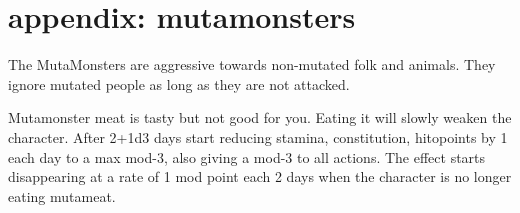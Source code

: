 \newpage
\section*{appendix: mutamonsters}

\raggedbottom

The MutaMonsters are aggressive towards non-mutated folk and animals. They ignore mutated people as long as they are not attacked.

Mutamonster meat is tasty but not good for you. Eating it will slowly weaken the character. After 2+1d3 days start reducing stamina, constitution, hitopoints by 1 each day to a max mod-3, also giving a mod-3 to all actions. The effect starts disappearing at a rate of 1 mod point each 2 days when the character is no longer eating mutameat.

